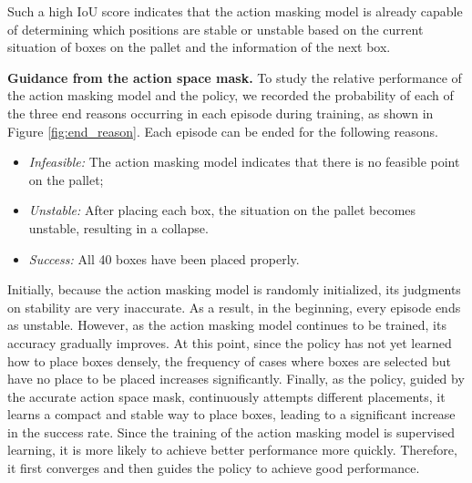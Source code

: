 Such a high IoU score indicates that the action masking model is already capable of determining which positions are stable or unstable based on the current situation of boxes on the pallet and the information of the next box.



\textbf{Guidance from the action space mask. } To study the relative performance of the action masking model and the policy, we recorded the probability of each of the three end reasons occurring in each episode during training, as shown in Figure \ref{fig:end_reason}. Each episode can be ended for the following reasons. 
\begin{itemize}
    \item \textit{Infeasible:} The action masking model indicates that there is no feasible point on the pallet; \item \textit{Unstable:} After placing each box, the situation on the pallet becomes unstable, resulting in a collapse.
    \item \textit{Success:} All 40 boxes have been placed properly.
\end{itemize}
Initially, because the action masking model is randomly initialized, its judgments on stability are very inaccurate. As a result, in the beginning, every episode ends as unstable. However, as the action masking model continues to be trained, its accuracy gradually improves. At this point, since the policy has not yet learned how to place boxes densely, the frequency of cases where boxes are selected but have no place to be placed increases significantly. Finally, as the policy, guided by the accurate action space mask, continuously attempts different placements, it learns a compact and stable way to place boxes, leading to a significant increase in the success rate. Since the training of the action masking model is supervised learning, it is more likely to achieve better performance more quickly. Therefore, it first converges and then guides the policy to achieve good performance.

